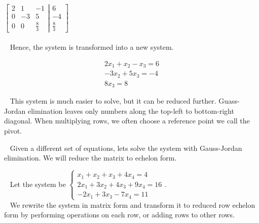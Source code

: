 \documentclass[12pt]{article}
\begin{document}
$\left[\left.\begin{matrix}
2 & 1 & -1\\
0 & -3 & 5\\
0 & 0 & \frac{8}{3}
\end{matrix}
\right|
\begin{matrix}
6\\
-4\\
\frac{8}{3}
\end{matrix}
\right]
$\\\\

$\,\,\,$ Hence, the system is transformed into a new system.

$$\begin{matrix}
2x_1+x_2-x_3=6\\
-3x_2+5x_3=-4\\
8x_3=8
\end{matrix}$$

$\,\,\,$ This system is much easier to solve, but it can be reduced further. Guass-Jordan elimination leaves only numbers along the top-left to bottom-right diagonal. When multiplying rows, we often choose a reference point we call the pivot.

$\,\,\,$ Given a different set of equations, lets solve the system with Gauss-Jordan elimination. We will reduce the matrix to echelon form.

$\,\,\,$ Let the system be $\left\lbrace\begin{matrix}x_1+x_2+x_3+4x_4=4\\2x_1+3x_2+4x_3+9x_4=16\\-2x_1+3x_3-7x_4=11\end{matrix}\right.$.\\

$\,\,\,$ We rewrite the system in matrix form and transform it to reduced row echelon form by performing operations on each row, or adding rows to other rows.
\end{document}
